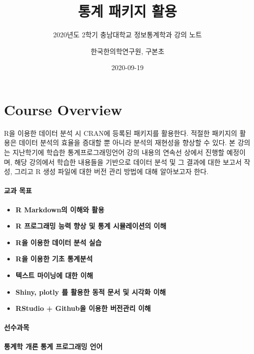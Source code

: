\documentclass[
  11pt,
]{krantz}
\title{통계 패키지 활용}
\subtitle{2020년도 2학기 충남대학교 정보통계학과 강의 노트}
\author{한국한의학연구원, 구본초}
\date{2020-09-19}
\makeatletter
\providecommand{\tightlist}{%
  \setlength{\itemsep}{0pt}\setlength{\parskip}{0pt}}
\newenvironment{kframe}{%
\medskip{}
\setlength{\fboxsep}{.8em}
 \def\at@end@of@kframe{}%
 \ifinner\ifhmode%
  \def\at@end@of@kframe{\end{minipage}}%
  \begin{minipage}{\columnwidth}%
 \fi\fi%
 \def\FrameCommand##1{\hskip\@totalleftmargin \hskip-\fboxsep
 \colorbox{shadecolor}{##1}\hskip-\fboxsep
     \hskip-\linewidth \hskip-\@totalleftmargin \hskip\columnwidth}%
 \MakeFramed {\advance\hsize-\width
   \@totalleftmargin\z@ \linewidth\hsize
   \@setminipage}}%
 {\par\unskip\endMakeFramed%
 \at@end@of@kframe}
\renewenvironment{quote}{\begin{kframe}}{\end{kframe}}
\makeatother
\begin{document}
\maketitle

{
\hypersetup{linkcolor=}
\setcounter{tocdepth}{2}
\tableofcontents
}
\listoftables
\listoffigures
\hypertarget{overview}{%
\chapter*{Course Overview}\label{overview}}


R을 이용한 데이터 분석 시 CRAN에 등록된 패키지를 활용한다. 적절한 패키지의 활용은 데이터 분석의 효율을 증대할 뿐 아니라 분석의 재현성을 향상할 수 있다. 본 강의는 지난학기에 학습한 통계프로그래밍언어 강의 내용의 연속선 상에서 진행할 예정이며, 해당 강의에서 학습한 내용들을 기반으로 데이터 분석 및 그 결과에 대한 보고서 작성, 그리고 R 생성 파일에 대한 버전 관리 방법에 대해 알아보고자 한다.

\hypertarget{purpose-course}{%
\subsubsection*{교과 목표}\label{purpose-course}}


\begin{quote}
\begin{itemize}
\tightlist
\item
  \textbf{R Markdown의 이해와 활용}
\item
  \textbf{R 프로그래밍 능력 향상 및 통계 시뮬레이션의 이해}
\item
  \textbf{R을 이용한 데이터 분석 실습}
\item
  \textbf{R을 이용한 기초 통계분석}
\item
  \textbf{텍스트 마이닝에 대한 이해}
\item
  \textbf{Shiny, plotly 를 활용한 동적 문서 및 시각화 이해}
\item
  \textbf{RStudio + Github을 이용한 버전관리 이해}
\end{itemize}
\end{quote}

\hypertarget{pre-course}{%
\subsubsection*{선수과목}\label{pre-course}}


\begin{quote}
\textbf{통계학 개론}
\textbf{통계 프로그래밍 언어}
\end{quote}
\end{document}
